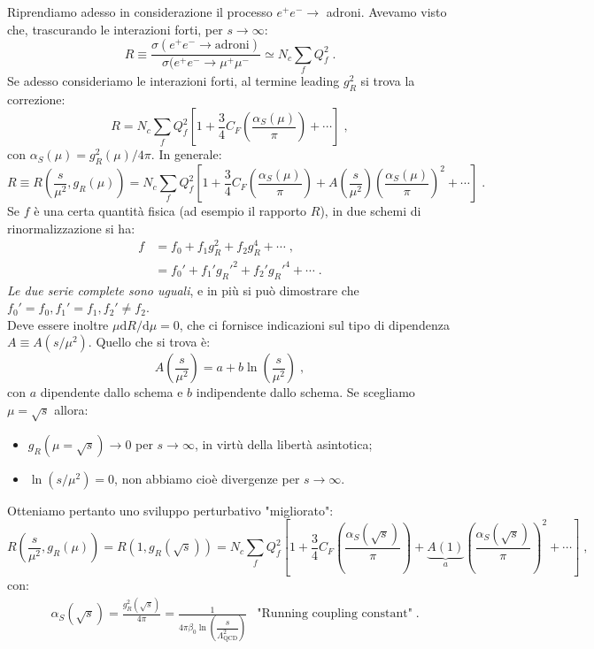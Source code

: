 \documentclass[12pt,a4paper]{article}
\theoremstyle{definition}
\newcommand{\diff}[1][]{\mathrm{d}#1}
\numberwithin{equation}{section}
\begin{document}
Riprendiamo adesso in considerazione il processo $e^+e^-\longrightarrow$ adroni. Avevamo visto che, trascurando le interazioni forti, per $s\to\infty$:
\begin{equation}
R\equiv \frac{\sigma(e^+e^-\longrightarrow\mathrm{adroni})}{\sigma(e^+e^-\to\mu^+\mu^-}\simeq N_c\sum_f Q_f^2\;.
\end{equation}
Se adesso consideriamo le interazioni forti, al termine leading $g_R^2$ si trova la correzione:
\begin{equation}
R=N_c\sum_fQ_f^2\left[1+\frac{3}{4}C_F\left(\frac{\alpha_S(\mu)}{\pi}\right)+\cdots\right]\;,
\end{equation}
con $\alpha_S(\mu)=g_R^2(\mu)/4\pi$. In generale:
\begin{equation}
R\equiv R\left(\frac{s}{\mu^2},g_R(\mu)\right)=N_c\sum_fQ_f^2\left[1+\frac{3}{4}C_F\left(\frac{\alpha_S(\mu)}{\pi}\right)+A\left(\frac{s}{\mu^2}\right)\left(\frac{\alpha_S(\mu)}{\pi}\right)^2+\cdots\right]\;.
\end{equation}
Se $f$ è una certa quantità fisica (ad esempio il rapporto $R$), in due schemi di rinormalizzazione si ha:
\begin{align*}
f &= f_0+f_1g_R^2+f_2g_R^4+\cdots\;, \\
&= f_0'+f_1'g_R'^2+f_2'g_R'^4+\cdots\;.
\end{align*}
\emph{Le due serie complete sono uguali}, e in più si può dimostrare che $f_0'=f_0,f_1'=f_1,f_2'\ne f_2$. \\
Deve essere inoltre $\mu\diff{R}/\diff{\mu}=0$, che ci fornisce indicazioni sul tipo di dipendenza $A\equiv A(s/\mu^2)$. Quello che si trova è:
\begin{equation}
A\left(\frac{s}{\mu^2}\right)=a+b\ln\left(\frac{s}{\mu^2}\right)\;,
\end{equation}
con $a$ dipendente dallo schema e $b$ indipendente dallo schema. Se scegliamo $\mu=\sqrt{s}$ allora:
\begin{itemize}
\item $g_R(\mu=\sqrt{s})\to 0$ per $s\to\infty$, in virtù della libertà asintotica;
\item $\ln(s/\mu^2)=0$, non abbiamo cioè divergenze per $s\to\infty$.
\end{itemize}
Otteniamo pertanto uno sviluppo perturbativo "migliorato":
\begin{equation}
R\left(\frac{s}{\mu^2},g_R(\mu)\right)=R(1,g_R(\sqrt{s}))=N_c\sum_fQ_f^2\left[1+\frac{3}{4}C_F\left(\frac{\alpha_S(\sqrt{s})}{\pi}\right)+\underbrace{A(1)}_{a}\left(\frac{\alpha_S(\sqrt{s})}{\pi}\right)^2+\cdots\right]\;,
\end{equation}
con:
\begin{align}
&\alpha_S(\sqrt{s})=\frac{g_R^2(\sqrt{s})}{4\pi}=\frac{1}{4\pi\beta_0\ln\left(\dfrac{s}{\Lambda^2_{\mathrm{QCD}}}\right)} & \mbox{"Running coupling constant"}\;.
\end{align}
\cleardoublepage
\end{document}
